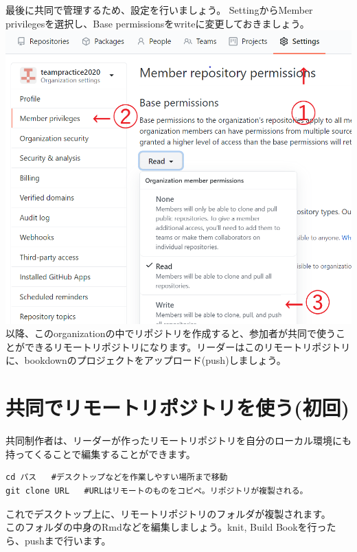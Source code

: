 \documentclass[
]{book}
\begin{document}
最後に共同で管理するため、設定を行いましょう。
SettingからMember privilegesを選択し、Base permissionsをwriteに変更しておきましょう。
\includegraphics{pics/write.png}
以降、このorganizationの中でリポジトリを作成すると、参加者が共同で使うことができるリモートリポジトリになります。リーダーはこのリモートリポジトリに、bookdownのプロジェクトをアップロード(push)しましょう。

\hypertarget{ux5171ux540cux3067ux30eaux30e2ux30fcux30c8ux30eaux30ddux30b8ux30c8ux30eaux3092ux4f7fux3046ux521dux56de}{%
\section{共同でリモートリポジトリを使う(初回)}\label{ux5171ux540cux3067ux30eaux30e2ux30fcux30c8ux30eaux30ddux30b8ux30c8ux30eaux3092ux4f7fux3046ux521dux56de}}

共同制作者は、リーダーが作ったリモートリポジトリを自分のローカル環境にも持ってくることで編集することができます。

\begin{verbatim}
cd パス   #デスクトップなどを作業しやすい場所まで移動
git clone URL   #URLはリモートのものをコピペ。リポジトリが複製される。
\end{verbatim}

これでデスクトップ上に、リモートリポジトリのフォルダが複製されます。\\
このフォルダの中身のRmdなどを編集しましょう。knit, Build Bookを行ったら、pushまで行います。
\end{document}
